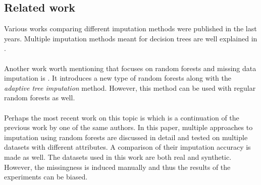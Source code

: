 \documentclass[11pt]{article}
\begin{document}
    \subsection{Related work}
      Various works comparing different imputation methods were published in the last years. Multiple imputation methods meant for decision trees are well explained in \cite{mia}.
      \\~\\
      Another work worth mentioning that focuses on random forests and missing data imputation is \cite{rsf}. It introduces a new type of random forests along with the {\it adaptive tree imputation} method. However, this method can be used with regular random forests as well.
      \\~\\
      Perhaps the most recent work on this topic is \cite{otfi} which is a continuation of the previous work by one of the same authors. In this paper, multiple approaches to imputation using random forests are discussed in detail and tested on multiple datasets with different attributes. A comparison of their imputation accuracy is made as well. The datasets used in this work are both real and synthetic. However, the missingness is induced manually \cite{otfi} and thus the results of the experiments can be biased.
    \\~\\
\end{document}
